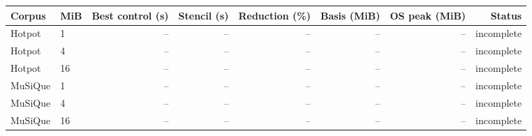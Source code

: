\begin{tabular}{llrrrrrr}\toprule
Corpus & MiB & Best control (s) & Stencil (s) & Reduction (\%) & Basis (MiB) & OS peak (MiB) & Status \\
\midrule
Hotpot & 1 & -- & -- & -- & -- & -- & incomplete \\
Hotpot & 4 & -- & -- & -- & -- & -- & incomplete \\
Hotpot & 16 & -- & -- & -- & -- & -- & incomplete \\
MuSiQue & 1 & -- & -- & -- & -- & -- & incomplete \\
MuSiQue & 4 & -- & -- & -- & -- & -- & incomplete \\
MuSiQue & 16 & -- & -- & -- & -- & -- & incomplete \\
\bottomrule\end{tabular}
